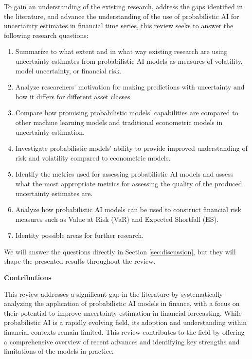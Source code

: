 To gain an understanding of the existing research, address the gaps identified in the literature, and advance the understanding of the use of probabilistic AI for uncertainty estimates in financial time series, this review seeks to answer the following research questions: 
\begin{enumerate}[label=RQ\arabic*:]
    \item Summarize to what extent and in what way existing research are using uncertainty estimates from probabilistic AI models as measures of volatility, model uncertainty, or financial risk.
    \item Analyze researchers' motivation for making predictions with uncertainty and how it differs for different asset classes.
    \item Compare how promising probabilistic models' capabilities are compared to other machine learning models and traditional econometric models in uncertainty estimation.
    \item Investigate probabilistic models' ability to provide improved understanding of risk and volatility compared to econometric models.
    \item Identify the metrics used for assessing probabilistic AI models and assess what the most appropriate metrics for assessing the quality of the produced uncertainty estimates are.
    \item Analyze how probabilistic AI models can be used to construct financial risk measures such as Value at Risk (VaR) and Expected Shortfall (ES).
    \item Identity possible areas for further research.
\end{enumerate}

We will answer the questions directly in Section \ref{sec:discussion}, but they will shape the presented results throughout the review. 

 
\textbf{Contributions}\nopagebreak

This review addresses a significant gap in the literature by systematically analyzing the application of probabilistic AI models in finance, with a focus on their potential to improve uncertainty estimation in financial forecasting. While probabilistic AI is a rapidly evolving field, its adoption and understanding within financial contexts remain limited. This review contributes to the field by offering a comprehensive overview of recent advances and identifying key strengths and limitations of the models in practice.

